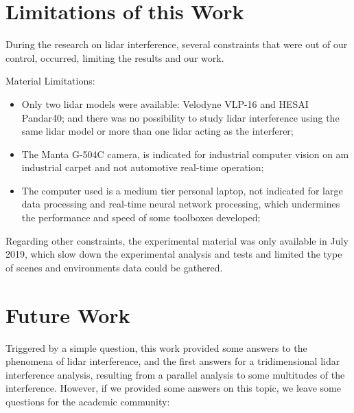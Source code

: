 \section{Limitations of this Work}
\label{sec:conclusion:limitations-of-this-work}

During the research on \ac{lidar} interference, several constraints that were out of our control, occurred, limiting the results and our work. 

Material Limitations:
\begin{itemize}
	\item Only two \ac{lidar} models were available: Velodyne VLP-16 and HESAI Pandar40; and there was no possibility to study \ac{lidar} interference using the same \ac{lidar} model or more than one \ac{lidar} acting as the interferer;
	\item The Manta G-504C camera, is indicated for industrial computer vision on am industrial carpet and not automotive real-time operation;
	\item The computer used is a medium tier personal laptop, not indicated for large data processing and real-time neural network processing, which undermines the performance and speed of some toolboxes developed;
		
\end{itemize}

Regarding other constraints, the experimental material was only available in July 2019, which slow down the experimental analysis and tests and limited the type of scenes and environments data could be gathered.


\section{Future Work}
\label{sec:conclusion:future-work}

Triggered by a simple question, this work provided some answers to the phenomena of \ac{lidar} interference, and the first answers for a tridimensional \ac{lidar} interference analysis, resulting from a parallel analysis to some multitudes of the interference. However, if we provided some answers on this topic, we leave some questions for the academic community:

